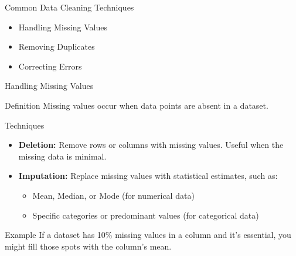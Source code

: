 \documentclass[aspectratio=169]{beamer}
\begin{document}
\begin{frame}[fragile]{Common Data Cleaning Techniques}
    \begin{itemize}
        \item Handling Missing Values
        \item Removing Duplicates
        \item Correcting Errors
    \end{itemize}
\end{frame}

\begin{frame}[fragile]{Handling Missing Values}
    \begin{block}{Definition}
        Missing values occur when data points are absent in a dataset.
    \end{block}
    
    \begin{block}{Techniques}
        \begin{itemize}
            \item \textbf{Deletion:} Remove rows or columns with missing values. Useful when the missing data is minimal.
            \item \textbf{Imputation:} Replace missing values with statistical estimates, such as:
            \begin{itemize}
                \item Mean, Median, or Mode (for numerical data)
                \item Specific categories or predominant values (for categorical data)
            \end{itemize}
        \end{itemize}
    \end{block}

    \begin{block}{Example}
        If a dataset has 10\% missing values in a column and it's essential, you might fill those spots with the column's mean.
    \end{block}
\end{frame}
\end{document}
